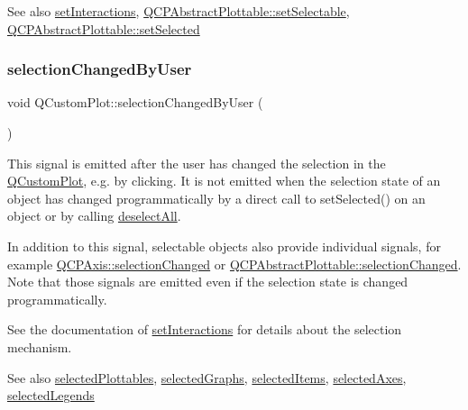 \begin{DoxySeeAlso}{See also}
\hyperlink{class_q_custom_plot_a5ee1e2f6ae27419deca53e75907c27e5}{set\+Interactions}, \hyperlink{class_q_c_p_abstract_plottable_a22c69299eb5569e0f6bf084877a37dc4}{Q\+C\+P\+Abstract\+Plottable\+::set\+Selectable}, \hyperlink{class_q_c_p_abstract_plottable_afbd5428c2952f59d952e11ab5cd79176}{Q\+C\+P\+Abstract\+Plottable\+::set\+Selected} 
\end{DoxySeeAlso}
\hypertarget{class_q_custom_plot_a500c64a109bc773c973ad274f2fa4190}{}\label{class_q_custom_plot_a500c64a109bc773c973ad274f2fa4190} 
\subsubsection{\texorpdfstring{selection\+Changed\+By\+User}{selectionChangedByUser}}
{\footnotesize\ttfamily void Q\+Custom\+Plot\+::selection\+Changed\+By\+User (\begin{DoxyParamCaption}{ }\end{DoxyParamCaption})\hspace{0.3cm}{\ttfamily [signal]}}

This signal is emitted after the user has changed the selection in the \hyperlink{class_q_custom_plot}{Q\+Custom\+Plot}, e.\+g. by clicking. It is not emitted when the selection state of an object has changed programmatically by a direct call to set\+Selected() on an object or by calling \hyperlink{class_q_custom_plot_a9d4808ab925b003054085246c92a257c}{deselect\+All}.

In addition to this signal, selectable objects also provide individual signals, for example \hyperlink{class_q_c_p_axis_a62b598abeee7174a05f9d542cc85b1f5}{Q\+C\+P\+Axis\+::selection\+Changed} or \hyperlink{class_q_c_p_abstract_plottable_a3af66432b1dca93b28e00e78a8c7c1d9}{Q\+C\+P\+Abstract\+Plottable\+::selection\+Changed}. Note that those signals are emitted even if the selection state is changed programmatically.

See the documentation of \hyperlink{class_q_custom_plot_a5ee1e2f6ae27419deca53e75907c27e5}{set\+Interactions} for details about the selection mechanism.

\begin{DoxySeeAlso}{See also}
\hyperlink{class_q_custom_plot_a747faaab57c56891e901a1e97fa4359a}{selected\+Plottables}, \hyperlink{class_q_custom_plot_ad3547aded026d8a9ae6ef13a69080d06}{selected\+Graphs}, \hyperlink{class_q_custom_plot_afda487bcf2d6cf1a57173d82495e29ba}{selected\+Items}, \hyperlink{class_q_custom_plot_a7e6b07792b1cb2c31681596582d14dbe}{selected\+Axes}, \hyperlink{class_q_custom_plot_ac87624ddff1cbf4064781a8e8ae321c4}{selected\+Legends} 
\end{DoxySeeAlso}
\hypertarget{class_q_custom_plot_aeef813bcf7efab8e765f9f87ec454691}{}\label{class_q_custom_plot_aeef813bcf7efab8e765f9f87ec454691} 
